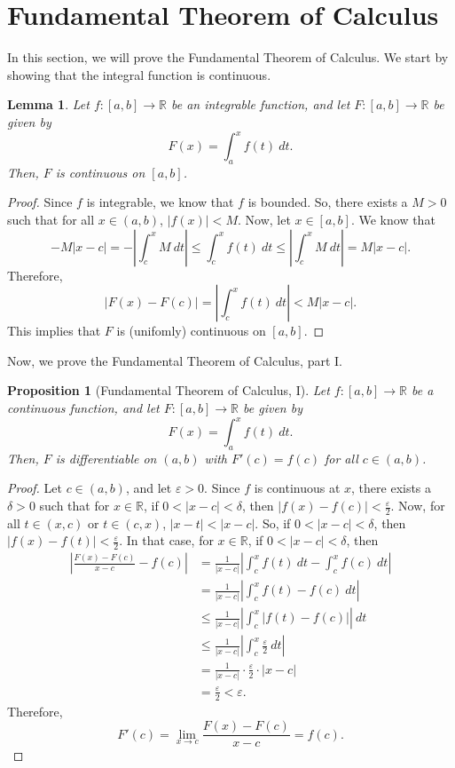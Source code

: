 \documentclass[a4paper, openany]{memoir}
\theoremstyle{definition}
\theoremstyle{plain}
\newtheorem{lemma}[definition]{Lemma}
\newtheorem{proposition}[definition]{Proposition}
\begin{document}
\section{Fundamental Theorem of Calculus}
In this section, we will prove the Fundamental Theorem of Calculus. We start by showing that the integral function is continuous.
\begin{lemma}
Let $f: [a, b] \to \mathbb{R}$ be an integrable function, and let $F: [a, b] \to \mathbb{R}$ be given by
\[F(x) = \int_a^x f(t) \ dt.\]
Then, $F$ is continuous on $[a, b]$.
\end{lemma}
\begin{proof}
Since $f$ is integrable, we know that $f$ is bounded. So, there exists a $M > 0$ such that for all $x \in (a, b)$, $|f(x)| < M$. Now, let $x \in [a, b]$. We know that
\[-M|x - c| = -\left|\int_c^x M \ dt\right| \leqslant \int_c^x f(t) \ dt \leqslant \left|\int_c^x M \ dt \right| = M|x - c|.\]
Therefore,
\[|F(x) - F(c)| = \left|\int_c^x f(t) \ dt \right| < M|x - c|.\]
This implies that $F$ is (unifomly) continuous on $[a, b]$.
\end{proof}
\noindent Now, we prove the Fundamental Theorem of Calculus, part I.
\begin{proposition}[Fundamental Theorem of Calculus, I]
Let $f: [a, b] \to \mathbb{R}$ be a continuous function, and let $F: [a, b] \to \mathbb{R}$ be given by
\[F(x) = \int_a^x f(t) \ dt.\]
Then, $F$ is differentiable on $(a, b)$ with $F'(c) = f(c)$ for all $c \in (a, b)$.
\end{proposition}
\begin{proof}
Let $c \in (a, b)$, and let $\varepsilon > 0$. Since $f$ is continuous at $x$, there exists a $\delta > 0$ such that for $x \in \mathbb{R}$, if $0 < |x - c| < \delta$, then $|f(x) - f(c)| < \frac{\varepsilon}{2}$. Now, for all $t \in (x, c)$ or $t \in (c, x)$, $|x - t| < |x - c|$. So, if $0 < |x - c| < \delta$, then $|f(x) - f(t)| < \frac{\varepsilon}{2}$. In that case, for $x \in \mathbb{R}$, if $0 < |x - c| < \delta$, then
\begin{align*}
    \left|\frac{F(x) - F(c)}{x - c} - f(c)\right| &= \frac{1}{|x - c|} \left|\int_c^x f(t) \ dt - \int_c^x f(c) \ dt \right| \\
    &= \frac{1}{|x - c|} \left|\int_c^x f(t) - f(c) \ dt\right| \\
    &\leqslant \frac{1}{|x - c|} \left|\int_c^x \left|f(t) - f(c)\right|\right| \ dt \\
    &\leqslant \frac{1}{|x - c|} \left|\int_c^x \frac{\varepsilon}{2} \ dt\right| \\
    &= \frac{1}{|x - c|} \cdot \frac{\varepsilon}{2} \cdot |x - c| \\
    &= \frac{\varepsilon}{2} < \varepsilon.
\end{align*}
Therefore,
\[F'(c) = \lim_{x \to c} \frac{F(x) - F(c)}{x - c} = f(c).\]
\end{proof}
\end{document}
